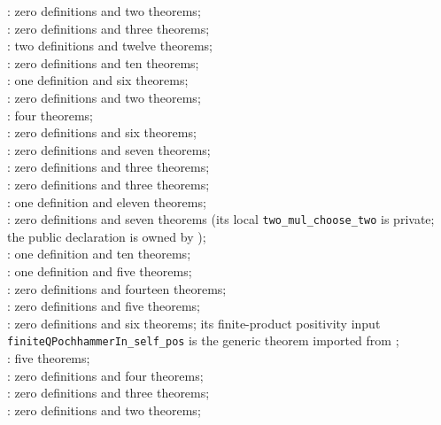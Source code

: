 \documentclass[11pt,a4paper,oneside,openany]{book}
\theoremstyle{definition}
\theoremstyle{remark}
\begin{document}
\begin{center}
: zero definitions and two theorems;\\
: zero definitions and three theorems;\\
: two definitions and twelve theorems;\\
: zero definitions and ten theorems;\\
: one definition and six theorems;\\
: zero definitions and two theorems;\\
: four theorems;\\
: zero definitions and six theorems;\\
: zero definitions and seven theorems;\\
: zero definitions and three theorems;\\
: zero definitions and three theorems;\\
: one definition and eleven theorems;\\
: zero definitions and seven theorems (its local
\texttt{two\_mul\_choose\_two} is private; the public declaration is owned by
);\\
: one definition and ten theorems;\\
: one definition and five theorems;\\
: zero definitions and fourteen
theorems;\\
: zero definitions and five
theorems;\\
: zero definitions and six theorems; its
finite-product positivity input \texttt{finiteQPochhammerIn\_self\_pos} is the
generic theorem imported from ;\\
: five theorems;\\
: zero definitions and four theorems;\\
: zero definitions and three theorems;\\
: zero definitions and two theorems;\\

\end{center}
\end{document}
